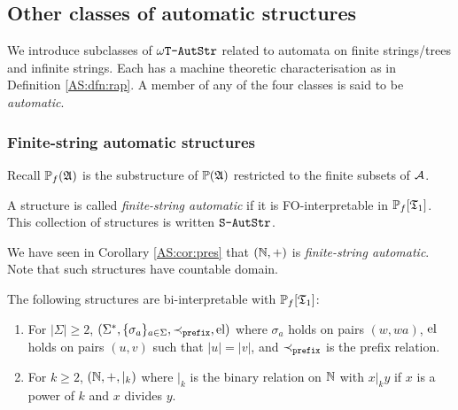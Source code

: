 \subsection{Other classes of automatic structures}

We introduce subclasses of $\mbox{\tt $\omega$T-AutStr}$ related to automata on finite strings/trees and infinite strings. 
Each has a machine theoretic characterisation as in Definition \ref{AS:dfn:rap}.
A member of any of the four classes is said to be {\em automatic}. 

\subsubsection*{Finite-string automatic structures}

Recall  ${\mathbb P}_f(\mathfrak{A})$ is the substructure of ${\mathbb P}(\mathfrak{A})$ restricted to the finite subsets of ${\mathcal A}$.

\begin{definition} 
A structure is called {\em finite-string automatic} if it is FO-interpretable in ${\mathbb P}_f[\mathfrak{T}_1]$. This collection of structures is written $\mbox{\tt S-AutStr}$.
\end{definition}

We have seen in Corollary \ref{AS:cor:pres} that $(\mathbb{N},+)$ is {\em finite-string automatic}. 
Note that such structures have countable domain. 

\begin{example} 
The following structures are bi-interpretable with ${\mathbb P}_f[\mathfrak{T}_1]$:
\begin{enumerate} 
\item For $|\Sigma| \geq 2$, $(\Sigma^\ast,\{\sigma_a\}_{a \in \Sigma},\prec_{\tt prefix},\text{el})$ 
where $\sigma_a$ holds on pairs $(w,wa)$, $\text{el}$ holds on pairs $(u,v)$ such that $|u|=|v|$, and $\prec_{\tt prefix}$ is the prefix relation.
\item For $k \geq 2$, $(\mathbb{N},+,|_k)$
where $|_k$ is the binary relation on $\mathbb{N}$ with $x |_k y$ if $x$ is a power of $k$ and $x$ divides $y$.
\end{enumerate}
\end{example}

